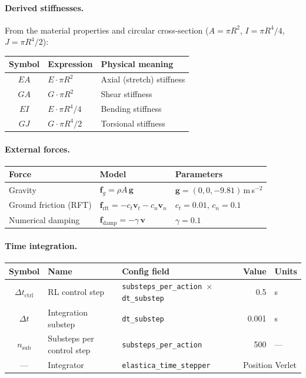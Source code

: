 \documentclass[11pt]{article}
\newcommand{\vect}[1]{\mathbf{#1}}
\begin{document}
\paragraph{Derived stiffnesses.}
From the material properties and circular cross-section ($A = \pi R^2$, $I = \pi R^4/4$, $J = \pi R^4/2$):

\begin{table}[H]
  \centering
  \begin{tabular}{clp{6cm}}
    \toprule
    Symbol & Expression & Physical meaning \\
    \midrule
    $EA$ & $E \cdot \pi R^2$ & Axial (stretch) stiffness \\
    $GA$ & $G \cdot \pi R^2$ & Shear stiffness \\
    $EI$ & $E \cdot \pi R^4 / 4$ & Bending stiffness \\
    $GJ$ & $G \cdot \pi R^4 / 2$ & Torsional stiffness \\
    \bottomrule
  \end{tabular}
\end{table}

\paragraph{External forces.}

\begin{table}[H]
  \centering
  \begin{tabular}{lp{5cm}l}
    \toprule
    Force & Model & Parameters \\
    \midrule
    Gravity & $\vect{f}_g = \rho A \, \vect{g}$ & $\vect{g} = (0, 0, -9.81)$\,m\,s$^{-2}$ \\
    Ground friction (RFT) & $\vect{f}_{\text{rft}} = -c_t \vect{v}_t - c_n \vect{v}_n$ & $c_t = 0.01$, $c_n = 0.1$ \\
    Numerical damping & $\vect{f}_{\text{damp}} = -\gamma\,\vect{v}$ & $\gamma = 0.1$ \\
    \bottomrule
  \end{tabular}
\end{table}

\paragraph{Time integration.}

\begin{table}[H]
  \centering
  \begin{tabular}{cllrl}
    \toprule
    Symbol & Name & Config field & Value & Units \\
    \midrule
    $\Delta t_{\text{ctrl}}$ & RL control step & \texttt{substeps\_per\_action $\times$ dt\_substep} & 0.5 & s \\
    $\Delta t$ & Integration substep & \texttt{dt\_substep} & 0.001 & s \\
    $n_{\text{sub}}$ & Substeps per control step & \texttt{substeps\_per\_action} & 500 & --- \\
    --- & Integrator & \texttt{elastica\_time\_stepper} & \multicolumn{2}{l}{Position Verlet} \\
    \bottomrule
  \end{tabular}
\end{table}
\end{document}
